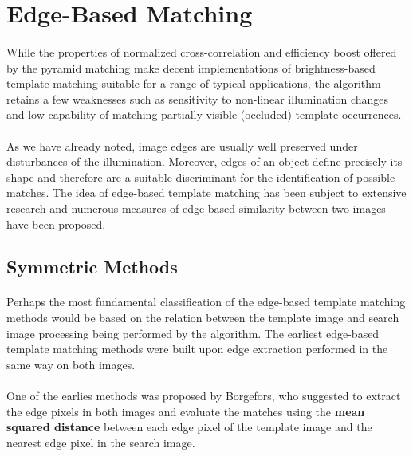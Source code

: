 \section{Edge-Based Matching}

\paragraph*{}
While the properties of normalized cross-correlation and efficiency boost offered by the pyramid matching make decent implementations of brightness-based template matching suitable for a range of typical applications, the algorithm retains a few weaknesses such as sensitivity to non-linear illumination changes and low capability of matching partially visible (occluded) template occurrences.

\paragraph*{}
As we have already noted, image edges are usually well preserved under disturbances of the illumination. Moreover, edges of an object define precisely its shape and therefore are a suitable discriminant for the identification of possible matches. The idea of edge-based template matching has been subject to extensive research and numerous measures of edge-based similarity between two images have been proposed. 

\subsection{Symmetric Methods}

\paragraph*{}
Perhaps the most fundamental classification of the edge-based template matching methods would be based on the relation between the template image and search image processing being performed by the algorithm. The earliest edge-based template matching methods were built upon edge extraction performed in the same way on both images. 

\paragraph*{}
One of the earlies methods was proposed\cite{Borgefors88} by Borgefors, who suggested to extract the edge pixels in both images and evaluate the matches using the \textbf{mean squared distance} between each edge pixel of the template image and the nearest edge pixel in the search image. 

